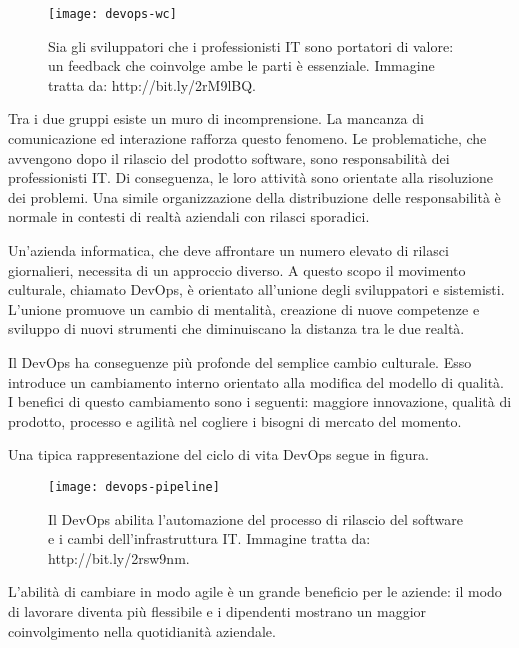 \begin{figure}[htbp]
	\begin{center}
		\texttt{[image: devops-wc]}
		\caption{Sia gli sviluppatori che i professionisti IT sono 
portatori di valore: 
	    un feedback che coinvolge ambe le parti è essenziale. Immagine 
tratta 
		da: http://bit.ly/2rM9lBQ.}
	\end{center}
\end{figure}


Tra i due gruppi esiste un muro di incomprensione. La mancanza di comunicazione 
ed 
interazione rafforza questo fenomeno. Le problematiche, che avvengono dopo il 
rilascio del prodotto 
software, sono responsabilità dei professionisti IT. Di conseguenza, le loro 
attività 
sono orientate alla risoluzione dei problemi. Una simile organizzazione della 
distribuzione 
delle responsabilità è normale in contesti di realtà aziendali con rilasci 
sporadici.  

Un'azienda informatica, che deve affrontare un numero elevato di rilasci 
giornalieri, 
necessita di un approccio diverso. A questo scopo il movimento culturale, 
chiamato DevOps, è orientato all'unione degli sviluppatori e sistemisti. 
L'unione promuove un cambio di mentalità, creazione di nuove competenze e 
sviluppo di nuovi strumenti che diminuiscano la distanza tra le due realtà. 

Il DevOps ha conseguenze più profonde del semplice cambio culturale.  
Esso introduce un cambiamento interno orientato alla modifica del modello 
di qualità. I benefici di questo cambiamento sono i seguenti: maggiore 
innovazione, qualità di prodotto, processo e agilità nel cogliere i bisogni di 
mercato del momento.

Una tipica rappresentazione del ciclo di vita DevOps segue in figura. 

\begin{figure}[htbp]
	\begin{center}
		\texttt{[image: devops-pipeline]}
		\caption{Il DevOps abilita l'automazione del processo di 
rilascio del software e i cambi dell'infrastruttura IT. Immagine tratta da: 
http://bit.ly/2rsw9nm.}
	\end{center}
\end{figure}

L'abilità di cambiare in modo agile è un grande beneficio per le aziende: il 
modo di lavorare diventa più flessibile e i dipendenti mostrano un maggior 
coinvolgimento nella quotidianità aziendale.    

